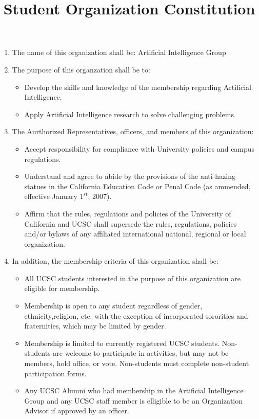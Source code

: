 \documentclass{article}
\title{Student Organization Constitution}
\date{}
\begin{document}
\maketitle

\begin{enumerate}

\item
  The name of this organization shall be: Artificial Intelligence Group

\item
  The purpose of this organzation shall be to: 
  \begin{itemize}
    \item Develop the skills and knowledge of the membership regarding Artificial Intelligence. 
    \item Apply Artificial Intelligence research to solve challenging problems.
  \end{itemize}

\item The Aurthorized Representatives, officers, and members of this organization:
  \begin{itemize}
    \item 
      Accept responsibility for compliance with University policies and campus regulations.
    \item 
      Understand and agree to abide by the provisions of the anti-hazing statues in the California Education Code or Penal Code (as ammended, effective January $1^{st}$, 2007).
    \item
      Affirm that the rules, regulations and policies of the University of California and UCSC shall supersede the rules, regulations, policies and/or bylaws of any affiliated international national, regional or local organization.
      
  \end{itemize}

\item
  In addition, the membership criteria of this organization shall be:
  \begin{itemize}
    \item 
      All UCSC students interested in the purpose of this organization are eligible for membership.
    \item
      Membership is open to any student regardless of gender, ethnicity,religion, etc. with the exception of incorporated sororities and fraternities, which may be limited by gender.
    \item
      Membership is limited to currently registered UCSC students. Non-students are welcome to participate in activities, but may not be members, hold office, or vote. Non-students must complete non-student participation forms.
    \item
      Any UCSC Alumni who had membership in the Artificial Intelligence Group and any UCSC staff member is elligible to be an Organization Advisor if approved by an officer. 
  \end{itemize}


\end{enumerate}
\end{document}
